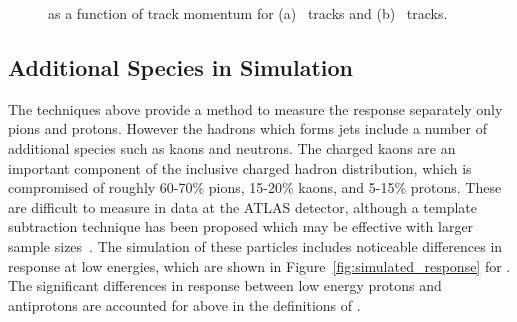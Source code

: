 \begin{figure}[h]
\centering
{}
\caption{\epcor as a function of track momentum for (a) \pip\ tracks and (b) \pim\ tracks.}
\label{fig:identified_epcor}
\end{figure}

\subsection{Additional Species in Simulation}

The techniques above provide a method to measure the response separately only pions and protons. 
However the hadrons which forms jets include a number of additional species such as kaons and neutrons. 
The charged kaons are an important component of the inclusive charged hadron distribution, which is compromised of roughly 60-70\% pions, 15-20\% kaons, and 5-15\% protons.
These are difficult to measure in data at the ATLAS detector, although a template subtraction technique has been proposed which may be effective with larger sample sizes~\cite{PERF-2015-05}.
The simulation of these particles includes noticeable differences in response at low energies, which are shown in Figure~\ref{fig:simulated_response} for \FTFP.
The significant differences in response between low energy protons and antiprotons are accounted for above in the definitions of \Ea. 

